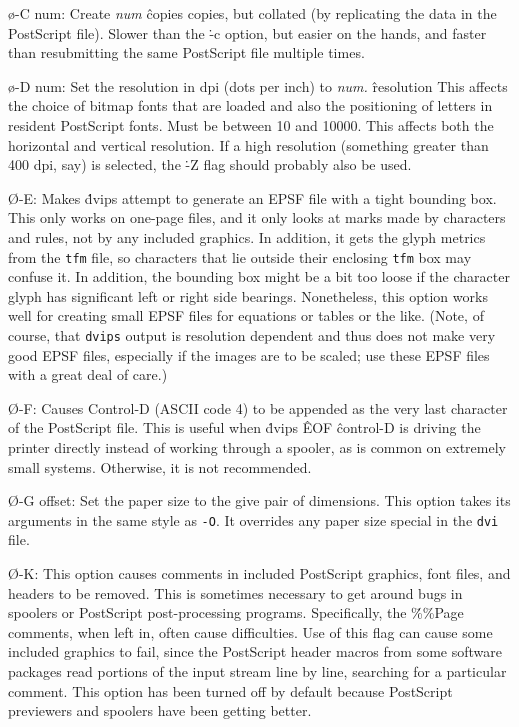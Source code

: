 {\o-C num:
Create {\it num}
\^{copies}
copies, but collated (by replicating the data in the PostScript file).
Slower than the \.{-c} option, but easier on the hands, and faster than
resubmitting the same PostScript file multiple times.

\o-D num:
Set the resolution in dpi (dots per inch) to {\it num.}
\^{resolution}
This affects the choice of bitmap fonts that are loaded and also the positioning
of letters in resident PostScript fonts. Must be between 10 and 10000.
This affects both the horizontal and vertical resolution.  If a high resolution
(something greater than 400 dpi, say) is selected, the \.{-Z} flag should
probably also be used.

\O-E:
Makes \.{dvips} attempt to generate an EPSF file with a tight bounding
box.  This only works on one-page files, and it only looks at marks made
by characters and rules, not by any included graphics.  In addition, it
gets the glyph metrics from the {\tt tfm} file, so characters that
lie outside their enclosing {\tt tfm} box may confuse it.  In addition,
the bounding box might be a bit too loose if the character glyph has
significant left or right side bearings.  Nonetheless, this option works
well for creating small EPSF files for equations or tables or the like.
(Note, of course, that {\tt dvips} output is resolution dependent and
thus does not make very good EPSF files, especially if the images are
to be scaled; use these EPSF files with a great deal of care.)

\O-F:
Causes Control-D (ASCII code 4) to be appended as the very last character
of the PostScript file.  This is useful when \.{dvips}
\^{EOF}
\^{control-D}
is driving the printer directly instead of working through a spooler,
as is common on extremely small systems.  Otherwise, it is not recommended.

\O-G offset:
Set the paper size to the give pair of dimensions.  This option takes
its arguments in the same style as {\tt -O}.  It overrides any paper
size special in the {\tt dvi} file.

\O-K:
This option causes comments in included PostScript graphics, font files,
and headers to be removed.  This is sometimes necessary to get around bugs
in spoolers or PostScript post-processing programs.  Specifically, the
\.{\%\%Page} comments, when left in, often cause difficulties.
Use of this flag can cause some included graphics to fail, since the
PostScript header macros from some software packages read portions of
the input stream line by line, searching for a particular comment.
This option has been turned off by default because PostScript previewers
and spoolers have been getting better.

}
